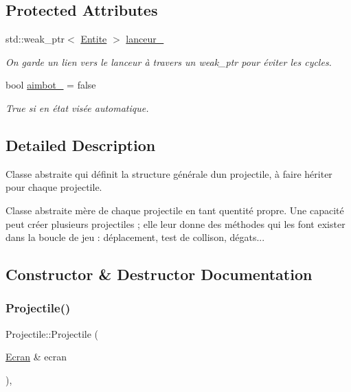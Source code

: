 \subsection*{Protected Attributes}
\begin{DoxyCompactItemize}
\item 
std\+::weak\+\_\+ptr$<$ \mbox{\hyperlink{class_entite}{Entite}} $>$ \mbox{\hyperlink{class_projectile_adb4bd9a7bb88e528d517236e887a1639}{lanceur\+\_\+}}
\begin{DoxyCompactList}\small\item\em On garde un lien vers le lanceur à travers un weak\+\_\+ptr pour éviter les cycles. \end{DoxyCompactList}\item 
bool \mbox{\hyperlink{class_projectile_ae179f4250f0afb1f754e62176f27345c}{aimbot\+\_\+}} = false
\begin{DoxyCompactList}\small\item\em True si en état visée automatique. \end{DoxyCompactList}\end{DoxyCompactItemize}


\subsection{Detailed Description}
Classe abstraite qui définit la structure générale d\textquotesingle{}un projectile, à faire hériter pour chaque projectile. 

Classe abstraite mère de chaque projectile en tant qu\textquotesingle{}entité propre. Une capacité peut créer plusieurs projectiles ; elle leur donne des méthodes qui les font exister dans la boucle de jeu \+: déplacement, test de collison, dégats... 

\subsection{Constructor \& Destructor Documentation}
\mbox{\label{class_projectile_a34d60aa7b97b30b0fc29d8a2a05db4b5}} 
\subsubsection{\texorpdfstring{Projectile()}{Projectile()}}
{\footnotesize\ttfamily Projectile\+::\+Projectile (\begin{DoxyParamCaption}\item[{\mbox{\hyperlink{class_ecran}{Ecran}} \&}]{ecran }\end{DoxyParamCaption})\hspace{0.3cm}{\ttfamily [inline]}, {\ttfamily [explicit]}}



